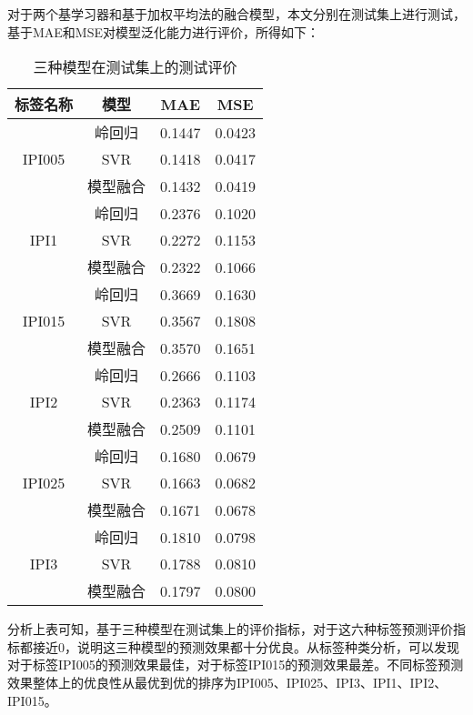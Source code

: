 对于两个基学习器和基于加权平均法的融合模型，本文分别在测试集上进行测试，基于MAE和MSE对模型泛化能力进行评价，所得如下：

\begin{table}[H]
    \centering  
    \caption{三种模型在测试集上的测试评价}
    \begin{tabular}{c c c c}  
    	\toprule[1.5pt]  
    	标签名称 & 模型 & MAE & MSE  \\  
    	\midrule[1pt]    
    	\multirow{3}{*}{IPI005} & 岭回归   & 0.1447	& 0.0423    \\ 
    	                        & SVR      & 0.1418	& 0.0417    \\
        	                    & 模型融合 & 0.1432	& 0.0419    \\
    	\multirow{3}{*}{IPI1}   & 岭回归   & 0.2376	& 0.1020    \\ 
    	                        & SVR      & 0.2272	& 0.1153    \\
        	                    & 模型融合 & 0.2322	& 0.1066    \\
    	\multirow{3}{*}{IPI015} & 岭回归   & 0.3669	& 0.1630	\\ 
    	                        & SVR      & 0.3567	& 0.1808	\\
        	                    & 模型融合 & 0.3570	& 0.1651	\\
    	\multirow{3}{*}{IPI2}   & 岭回归   & 0.2666	& 0.1103	\\ 
    	                        & SVR      & 0.2363	& 0.1174	\\
        	                    & 模型融合 & 0.2509	& 0.1101	\\
    	\multirow{3}{*}{IPI025} & 岭回归   & 0.1680	& 0.0679	\\ 
    	                        & SVR      & 0.1663	& 0.0682	\\
        	                    & 模型融合 & 0.1671	& 0.0678	\\
    	\multirow{3}{*}{IPI3}   & 岭回归   & 0.1810	& 0.0798	\\ 
    	                        & SVR      & 0.1788	& 0.0810	\\
        	                    & 模型融合 & 0.1797	& 0.0800    \\
    	\toprule[1.5pt]  
    \end{tabular}  
\end{table} 

分析上表可知，基于三种模型在测试集上的评价指标，对于这六种标签预测评价指标都接近0，说明这三种模型的预测效果都十分优良。从标签种类分析，可以发现对于标签IPI005的预测效果最佳，对于标签IPI015的预测效果最差。不同标签预测效果整体上的优良性从最优到优的排序为IPI005、IPI025、IPI3、IPI1、IPI2、IPI015。

